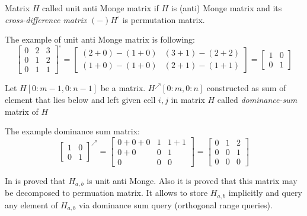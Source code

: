 \begin{definition}
Matrix $H$ called unit anti Monge matrix if $H$ is (anti) Monge matrix and its \emph{cross-difference matrix} $(-)H^{\square}$ is permutation matrix.
\end{definition}
The example of unit anti Monge matrix is following:
\begin{equation}
\begin{bmatrix}
0 & 2 & 3 \\
0 & 1 & 2 \\
0 & 1 & 1
\end{bmatrix} ^ { \square} =
\begin{bmatrix}
(2 + 0) - (1 + 0)  & (3 + 1) - (2 + 2)  \\
(1 + 0) - (1 + 0) &  (2 + 1) - (1 + 1) 
\end{bmatrix} = 
\begin{bmatrix}
1 & 0  \\
0 & 1 
\end{bmatrix} 
\end{equation}
 


\begin{definition}
Let $H[0:m-1,0:n-1]$  be a matrix.
$H^{\nearrow}[0:m,0:n]$ constructed as sum of element that lies below and left given cell $i,j$ in matrix $H$ called \emph{dominance-sum} matrix of $H$
\end{definition}

The example dominance sum matrix:
\begin{equation}
\begin{bmatrix}
1 & 0  \\
0 & 1 
\end{bmatrix}^{\nearrow} =
\begin{bmatrix}
0+0+0 & 1 & 1+1 \\
0+0 & 0 & 1 \\
0 & 0 & 0
\end{bmatrix} =
\begin{bmatrix}
0 & 1 & 2 \\
0 & 0 & 1 \\
0 & 0 & 0
\end{bmatrix}
\end{equation}

In \cite{tiskin} is proved that $H_{a,b}$ is unit anti Monge.
Also it is proved that  this matrix may be decomposed to permuation matrix.
It allows to store $H_{a,b}$ implicitly and query any element of $H_{a,b}$ via dominance sum query (orthogonal range queries).

